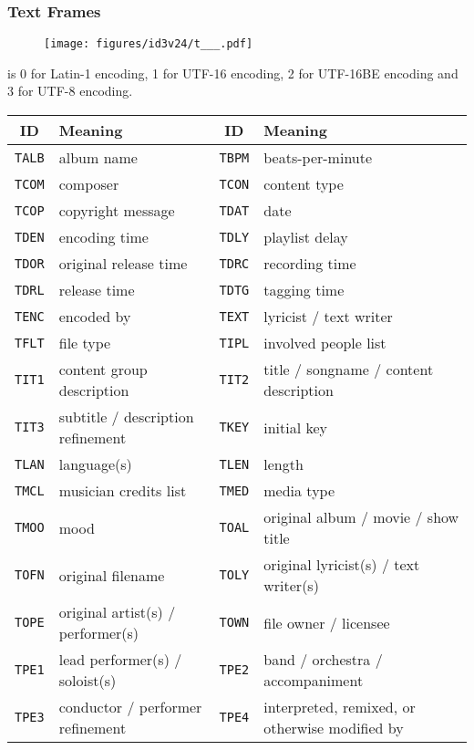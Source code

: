 \subsubsection{Text Frames}
\begin{figure}[h]
\texttt{[image: figures/id3v24/t\_\_\_.pdf]}
\end{figure}
 is 0 for Latin-1 encoding, 1 for UTF-16 encoding,
2 for UTF-16BE encoding and 3 for UTF-8 encoding.
\begin{table}[h]
{
\begin{tabular}{|c|l||c|l|}
\hline
ID & Meaning & ID & Meaning \\
\hline
\texttt{TALB} & album name &
\texttt{TBPM} & beats-per-minute \\
\texttt{TCOM} & composer &
\texttt{TCON} & content type \\
\texttt{TCOP} & copyright message &
\texttt{TDAT} & date \\
\texttt{TDEN} & encoding time &
\texttt{TDLY} & playlist delay \\
\texttt{TDOR} & original release time &
\texttt{TDRC} & recording time \\
\texttt{TDRL} & release time &
\texttt{TDTG} & tagging time \\
\texttt{TENC} & encoded by &
\texttt{TEXT} & lyricist / text writer \\
\texttt{TFLT} & file type &
\texttt{TIPL} & involved people list \\
\texttt{TIT1} & content group description &
\texttt{TIT2} & title / songname / content description \\
\texttt{TIT3} & subtitle / description refinement &
\texttt{TKEY} & initial key \\
\texttt{TLAN} & language(s) &
\texttt{TLEN} & length \\
\texttt{TMCL} & musician credits list &
\texttt{TMED} & media type \\
\texttt{TMOO} & mood &
\texttt{TOAL} & original album / movie / show title \\
\texttt{TOFN} & original filename &
\texttt{TOLY} & original lyricist(s) / text writer(s) \\
\texttt{TOPE} & original artist(s) / performer(s) &
\texttt{TOWN} & file owner / licensee \\
\texttt{TPE1} & lead performer(s) / soloist(s) &
\texttt{TPE2} & band / orchestra / accompaniment \\
\texttt{TPE3} & conductor / performer refinement &
\texttt{TPE4} & interpreted, remixed, or otherwise modified by \\

\end{tabular}}
\end{table}
